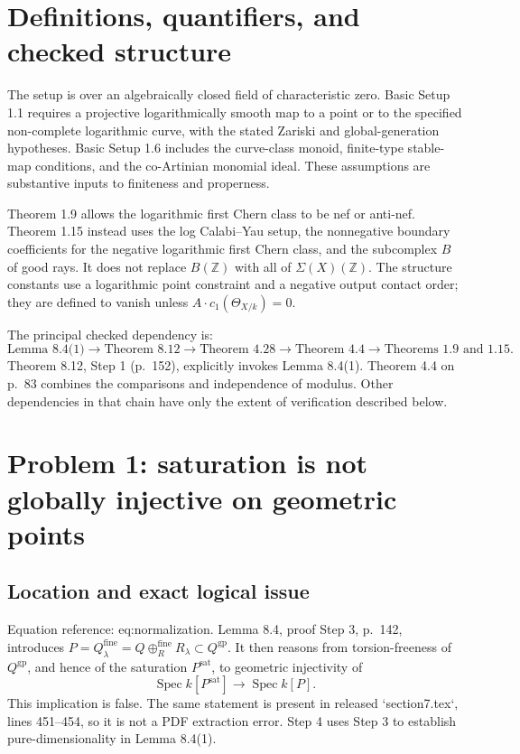 \documentclass[10pt]{article}
\begin{document}
\section*{Definitions, quantifiers, and checked structure}
The setup is over an algebraically closed field of characteristic zero. Basic Setup 1.1 requires a projective logarithmically smooth map to a point or to the specified non-complete logarithmic curve, with the stated Zariski and global-generation hypotheses. Basic Setup 1.6 includes the curve-class monoid, finite-type stable-map conditions, and the co-Artinian monomial ideal. These assumptions are substantive inputs to finiteness and properness.\par
Theorem 1.9 allows the logarithmic first Chern class to be nef or anti-nef. Theorem 1.15 instead uses the log Calabi–Yau setup, the nonnegative boundary coefficients for the negative logarithmic first Chern class, and the subcomplex \(B\) of good rays. It does not replace \(B(\mathbb Z)\) with all of \(\Sigma(X)(\mathbb Z)\). The structure constants use a logarithmic point constraint and a negative output contact order; they are defined to vanish unless \(A\cdot c_1(\Theta_{X/k})=0\).\par
The principal checked dependency is: \[\text{Lemma 8.4(1)}
\longrightarrow \text{Theorem 8.12}
\longrightarrow \text{Theorem 4.28}
\longrightarrow \text{Theorem 4.4}
\longrightarrow \text{Theorems 1.9 and 1.15}.\] Theorem 8.12, Step 1 (p. 152), explicitly invokes Lemma 8.4(1). Theorem 4.4 on p. 83 combines the comparisons and independence of modulus. Other dependencies in that chain have only the extent of verification described below.\par
\section*{Problem 1: saturation is not globally injective on geometric points}
\subsection*{Location and exact logical issue}
Equation reference: eq:normalization. Lemma 8.4, proof Step 3, p. 142, introduces \(P=Q_\lambda^{\mathrm{fine}}=Q\oplus_R^{\mathrm{fine}}R_\lambda\subset Q^\mathrm{gp}\). It then reasons from torsion-freeness of \(Q^\mathrm{gp}\), and hence of the saturation \(P^\mathrm{sat}\), to geometric injectivity of \[\operatorname{Spec}k[P^\mathrm{sat}]\longrightarrow\operatorname{Spec}k[P].
\tag{1}\] This implication is false. The same statement is present in released `section7.tex`, lines 451–454, so it is not a PDF extraction error. Step 4 uses Step 3 to establish pure-dimensionality in Lemma 8.4(1).\par
\end{document}
